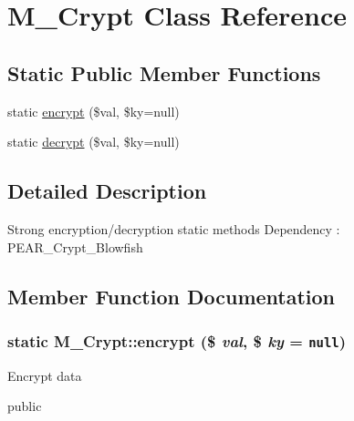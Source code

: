 \hypertarget{classM__Crypt}{
\section{M\_\-Crypt Class Reference}
\label{classM__Crypt}
}
\subsection*{Static Public Member Functions}
\begin{CompactItemize}
\item 
static \hyperlink{classM__Crypt_a5ade8a13de82594652939826b451f7d}{encrypt} (\$val, \$ky=null)
\item 
static \hyperlink{classM__Crypt_44eaf793613f9c8a5ba0626a3746f968}{decrypt} (\$val, \$ky=null)
\end{CompactItemize}


\subsection{Detailed Description}
Strong encryption/decryption static methods Dependency : PEAR\_\-Crypt\_\-Blowfish 

\subsection{Member Function Documentation}
\hypertarget{classM__Crypt_a5ade8a13de82594652939826b451f7d}{
\subsubsection[encrypt]{\setlength{\rightskip}{0pt plus 5cm}static M\_\-Crypt::encrypt (\$ {\em val}, \/  \$ {\em ky} = {\tt null})}}
\label{classM__Crypt_a5ade8a13de82594652939826b451f7d}


Encrypt data

public

